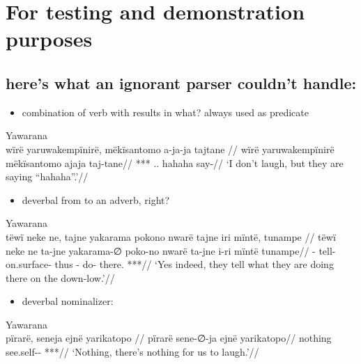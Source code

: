 \documentclass{memoir}
\begin{document}
\chapter{For testing and demonstration purposes}

\section{here's what an ignorant parser couldn't handle:}

\begin{itemize}
\tightlist
\item
  combination of verb with  results in what? always used
  as predicate
\end{itemize}

\ex Yawarana \\
\label{convrisamaj-07}    \begingl
    \glpreamble  wïrë yaruwakempïnirë, mëkïsantomo a-ja-ja tajtane //
    \gla wïrë yaruwakempïnirë mëkïsantomo ajaja taj-tane//
    \glb {} *** .. hahaha say-//
        \glft ‘I don’t laugh, but they are saying “hahaha”.’//  
    \endgl 
\xe

\begin{itemize}
\tightlist
\item
  deverbal from  to an adverb, right?
\end{itemize}

\ex Yawarana \\
\label{convrisamaj-09}    \begingl
    \glpreamble  tëwï neke ne, tajne yakarama pokono nwarë tajne iri mïntë, tunampe //
    \gla tëwï neke ne ta-jne yakarama-∅ poko-no nwarë ta-jne i-ri mïntë tunampe//
    \glb {}   - tell- on.surface- thus - do- there. ***//
        \glft ‘Yes indeed, they tell what they are doing there on the down-low.’//  
    \endgl 
\xe

\begin{itemize}
\tightlist
\item
  deverbal nominalizer:
\end{itemize}

\ex Yawarana \\
\label{convrisamaj-13}    \begingl
    \glpreamble  pïrarë, seneja ejnë yarikatopo //
    \gla pïrarë sene-∅-ja ejnë yarikatopo//
    \glb nothing see.self--  ***//
        \glft ‘Nothing, there’s nothing for us to laugh.’//  
    \endgl 
\xe
\end{document}
